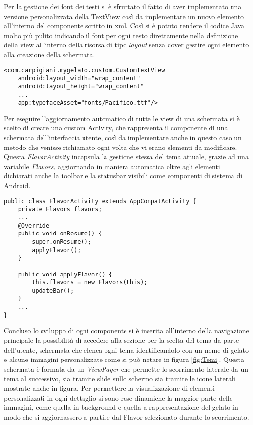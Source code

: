 Per la gestione dei font dei testi si è sfruttato il fatto di aver
implementato una versione personalizzata della TextView così da implementare
un nuovo elemento all'interno del componente scritto in xml. Così
si è potuto rendere il codice Java molto più pulito indicando il font
per ogni testo direttamente nella definizione della view all'interno
della risorsa di tipo \emph{layout} senza dover gestire ogni elemento
alla creazione della schermata.

\begin{lstlisting}
<com.carpigiani.mygelato.custom.CustomTextView             
	android:layout_width="wrap_content"
	android:layout_height="wrap_content"
	...
	app:typefaceAsset="fonts/Pacifico.ttf"/>
\end{lstlisting}
Per eseguire l'aggiornamento automatico di tutte le view di una schermata
si è scelto di creare una custom Activity, che rappresenta il componente
di una schermata dell'interfaccia utente, così da implementare anche
in questo caso un metodo che venisse richiamato ogni volta che vi
erano elementi da modificare. Questa \emph{FlavorActivity} incapsula
la gestione stessa del tema attuale, grazie ad una variabile \emph{Flavors},
aggiornando in maniera automatica oltre agli elementi dichiarati anche
la toolbar e la statusbar visibili come componenti di sistema di Android.

\begin{lstlisting}
public class FlavorActivity extends AppCompatActivity {
    private Flavors flavors;
    ...
    @Override     
	public void onResume() {
        super.onResume();
        applyFlavor();
    }

    public void applyFlavor() {
        this.flavors = new Flavors(this);
        updateBar();
    }
    ...
}
\end{lstlisting}
Concluso lo sviluppo di ogni componente si è inserita all'interno
della navigazione principale la possibilità di accedere alla sezione
per la scelta del tema da parte dell'utente, schermata che elenca
ogni tema identificandolo con un nome di gelato e alcune immagini
personalizzate come si può notare in figura \ref{fig:Temi}. Questa
schermata è formata da un \emph{ViewPager} che permette lo scorrimento
laterale da un tema al successivo, sia tramite slide sullo schermo
sia tramite le icone laterali mostrate anche in figura. Per permettere
la visualizzazione di elementi personalizzati in ogni dettaglio si
sono rese dinamiche la maggior parte delle immagini, come quella in
background e quella a rappresentazione del gelato in modo che si aggiornassero
a partire dal Flavor selezionato durante lo scorrimento.

